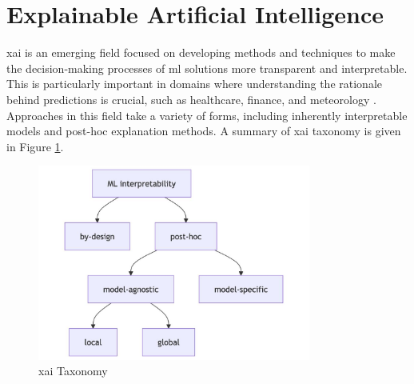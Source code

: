 \section{Explainable Artificial Intelligence}

\acrfull{xai} is an emerging field focused on developing methods and techniques to make the decision-making processes of \acrshort{ml} solutions more transparent and interpretable. This is particularly important in domains where understanding the rationale behind predictions is crucial, such as healthcare, finance, and meteorology \citep{BarredoArrieta2019,Wiens2019,Zhang2025}. Approaches in this field take a variety of forms, including inherently interpretable models and post-hoc explanation methods. A summary of \acrshort{xai} taxonomy is given in Figure \ref{fig:xai-taxonomy}.

\begin{figure}[h]
    \centering
    \includegraphics[width=0.8\textwidth]{../figures/static/xai-taxonomy.jpg}
    \caption{\acrshort{xai} Taxonomy \citep{Molnar2025}}
    \label{fig:xai-taxonomy}
\end{figure}

